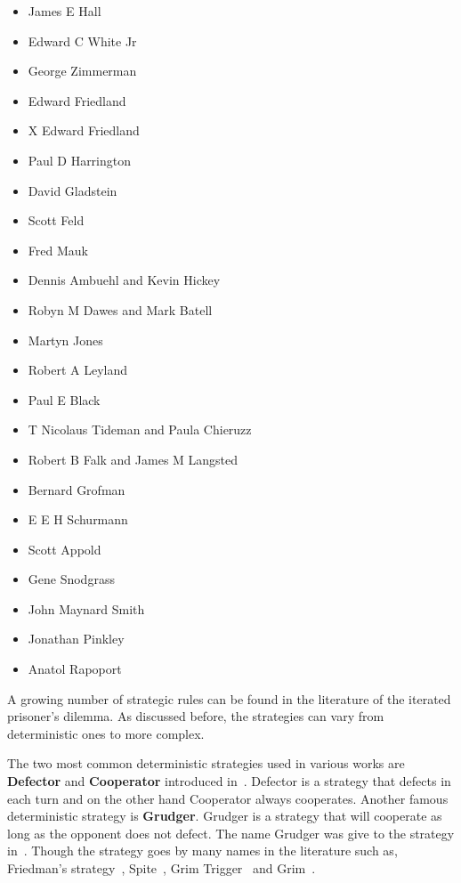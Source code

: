 \documentclass{article}
\begin{document}
\begin{multicols}{3}
\begin{itemize}
    \item James E Hall
    \item Edward C White Jr
    \item George Zimmerman
    \item Edward Friedland
    \item X	Edward Friedland
    \item Paul D Harrington
    \item David Gladstein
    \item Scott Feld
    \item Fred Mauk
    \item Dennis Ambuehl and Kevin Hickey
    \item Robyn M Dawes and Mark Batell
    \item Martyn Jones
    \item Robert A Leyland
    \item Paul E Black
    \item T Nicolaus Tideman and Paula Chieruzz
    \item Robert B Falk and James M Langsted
    \item Bernard Grofman
    \item E E H Schurmann
    \item Scott Appold
    \item Gene Snodgrass
    \item John Maynard Smith
    \item Jonathan Pinkley
    \item Anatol Rapoport
\end{itemize}
\end{multicols}

A growing number of strategic rules can be found in the literature of the
iterated prisoner's dilemma. As discussed before, the strategies can vary from
deterministic ones to more complex.

The two most common deterministic strategies used in various works are
\textbf{Defector} and \textbf{Cooperator} introduced in~\cite{Axelrod1981}.
Defector is a strategy that defects in each turn and on the other hand Cooperator
always cooperates. Another famous deterministic strategy is \textbf{Grudger}.
Grudger is a strategy that will cooperate as long as the opponent does not 
defect. The name Grudger was give to the strategy in~\cite{Li2014}.
Though the strategy goes by many names in the literature such as, 
Friedman's strategy~\cite{Axelrod1981}, Spite~\cite{Beaufils1997}, 
Grim Trigger~\cite{Banks1990} and Grim~\cite{Van2015}.
\end{document}
